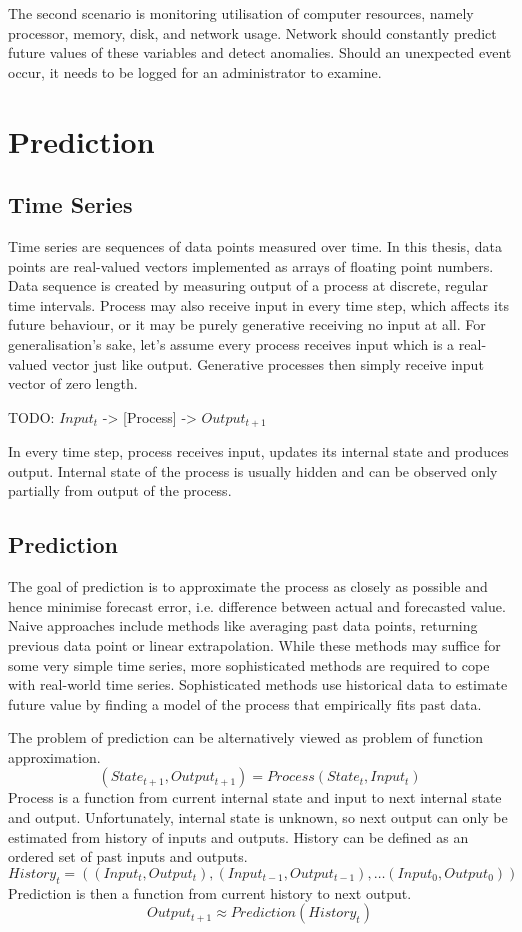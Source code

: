 \documentclass[12pt,oneside]{fithesis2}
\begin{document}
\par %
The second scenario is monitoring utilisation of computer resources, namely processor, memory, disk, and network usage. Network should constantly predict future values of these variables and detect anomalies. Should an unexpected event occur, it needs to be logged for an administrator to examine.
\par

\chapter{Prediction}
\section{Time Series}
Time series are sequences of data points measured over time. In this thesis, data points are real-valued vectors implemented as arrays of floating point numbers. Data sequence is created by measuring output of a process at discrete, regular time intervals. %
Process may also receive input in every time step, which affects its future behaviour, or it may be purely generative receiving no input at all. For generalisation's sake, let's assume every process receives input which is a real-valued vector just like output. Generative processes then simply receive input vector of zero length.
\begin{center}
	TODO: $Input_t$ -> [Process] -> $Output_{t+1}$
\end{center}
In every time step, process receives input, updates its internal state and produces output. Internal state of the process is usually hidden and can be observed only partially from output of the process. %

\section{Prediction}
The goal of prediction is to approximate the process as closely as possible and hence minimise forecast error, i.e. difference between actual and forecasted value. Naive approaches include methods like averaging past data points, returning previous data point or linear extrapolation. While these methods may suffice for some very simple time series, more sophisticated methods are required to cope with real-world time series. Sophisticated methods use historical data to estimate future value by finding a model of the process that empirically fits past data. \par
The problem of prediction can be alternatively viewed as problem of function approximation.
	$$\left(State_{t+1}, Output_{t+1}\right) = Process(State_t, Input_t)$$
Process is a function from current internal state and input to next internal state and output. Unfortunately, internal state is unknown, so next output can only be estimated from history of inputs and outputs. History can be defined as an ordered set of past inputs and outputs.
	$$History_t = \left( (Input_{t}, Output_{t}), (Input_{t-1}, Output_{t-1}), \dots (Input_{0}, Output_{0}) \right)$$
Prediction is then a function from current history to next output.
	$$Output_{t+1} \approx Prediction( History_t )$$
\end{document}
